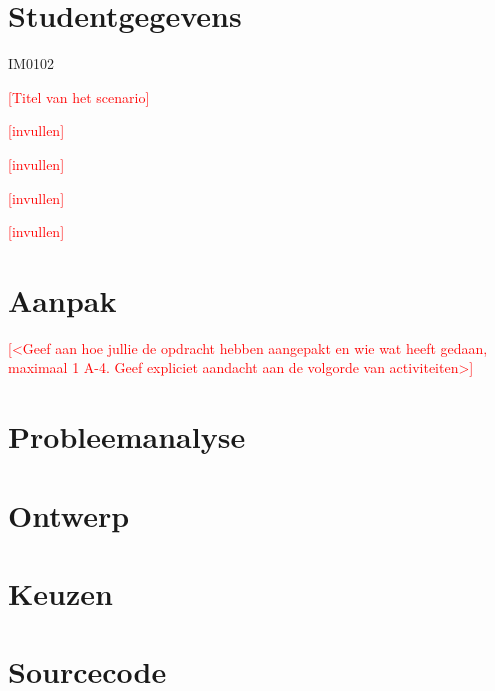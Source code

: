 \documentclass[a4paper]{article}
\newcommand{\todo}[1]{\textcolor{red}{[#1]}}
\begin{document}
\pagestyle{fancy}

\section*{Studentgegevens}
\begin{description}
	\item [Cursuscode] IM0102
	\item \todo{Titel van het scenario}
	\item [Naam] \todo{invullen}
	\item [Studentnummer] \todo{invullen}
	\item [Naam] \todo{invullen}
	\item [Studentnummer] \todo{invullen}
\end{description}

\section*{Aanpak}
\todo{<Geef aan hoe jullie de opdracht hebben aangepakt en wie wat heeft gedaan, maximaal 1 A-4. Geef expliciet aandacht aan de volgorde van activiteiten>}



\section{Probleemanalyse}


\section{Ontwerp}


\section{Keuzen}



\section{Sourcecode}
\end{document}
